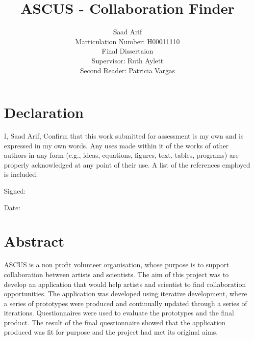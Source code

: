 \documentclass[a4paper,oneside,11pt]{report}
\begin{document}
\title{ASCUS - Collaboration Finder}
\author{Saad Arif\\ Marticulation Number: H00011110 \\Final Dissertaion \\ Supervisor: Ruth Aylett \\ Second Reader: Patricia Vargas}
\maketitle
\pagestyle{empty} %
\tableofcontents %
\listoffigures
{}
\pagestyle{plain} %
\listoftables
{}
\cleardoublepage %
\pagestyle{plain} %
\setcounter{page}{1} %


\chapter*{Declaration}%
%
I, Saad Arif, Confirm that this work submitted for assessment is my own and is expressed in my own 
words. Any uses made within it of the works of other authors in any form (e.g., ideas, equations, figures, 
text, tables, programs) are properly acknowledged at any point of their use. A list of the references 
employed is included. 
 
Signed: 
 
Date:

\chapter*{Abstract}%
%
ASCUS is a non profit volunteer organisation, whose purpose is to support collaboration between artists and scientists. The aim of this project was to develop an application that would help artists and scientist to find collaboration opportunities.  The application was developed using iterative development, where a series of prototypes were produced and continually updated through a series of iterations. Questionnaires were used to evaluate the prototypes and the final product. The result of the final questionnaire showed that the application produced was fit for purpose and the project had met its original aims.
\end{document}
